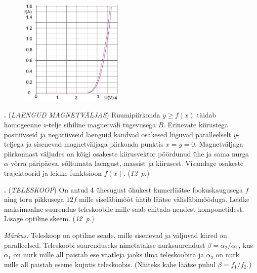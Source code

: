 \documentclass[12pt,a5paper]{article}
\newcommand{\numb}[1]{\vspace{5pt}\textbf{\large #1}}
\newcommand{\nimi}[1]{(\textsl{\small #1})}
\newcommand{\punktid}[1]{(\emph{#1~p.})}
\newcounter{ylesanne}
\newcommand{\yl}[1]{\addtocounter{ylesanne}{1}\numb{\theylesanne.} \nimi{#1} \newblock{}}
\begin{document}
\begin{figure}
\vspace{-15pt}
\includegraphics[width = 0.45\textwidth]{2dioodi-vi}
\end{figure}



\yl{LAENGUD MAGNETVÄLJAS} Ruumipiirkonda $y\ge f(x)$ täidab homogeenne $z$-telje sihiline magnetväli tugevusega $B$. Erinevate kiirustega positiivseid ja negatiivseid laenguid kandvad osakesed liiguvad paralleelselt $y$-teljega ja sisenevad magnetväljaga piirkonda punktis $x=y=0$. Magnetväljaga piirkonnast väljudes on kõigi osakeste kiirusvektor pöördunud ühe ja sama nurga $\alpha$ võrra päripäeva, sõltumata laengust, massist ja kiirusest. Visandage osakeste trajektoorid ja leidke funktsioon $f(x)$. \punktid{12}

\yl{TELESKOOP} On antud 4 ühesugust õhukest kumerläätse fookuskaugusega $f$ ning toru pikkusega $12f$ mille siseläbimõõt ühtib läätse välisläbimõõduga. Leidke maksimaalne suurendus teleskoobile mille saab ehitada nendest komponetidest. Lisage optiline skeem. \punktid{12}

\emph{Märkus:} Teleskoop on optiline seade, mille sisenevad ja väljuvad kiired on paralleelsed. Teleskoobi suurenduseks nimetatakse nurksuurendust $ \beta = {\alpha}_{2} / {\alpha}_{1}$, kus $\alpha_1$ on nurk mille all paistab ese vaatleja jaoks ilma teleskoobita ja $\alpha_2$ on nurk mille all paistab eseme kujutis teleskoobis. (Näiteks kahe läätse puhul $ \beta = f_1 / f_2 $.)
\end{document}
